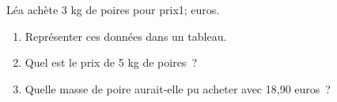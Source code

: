\documentclass[exercice]{thedocument}%
\begin{document}
%
Léa achète 3 kg de poires pour \<prix1; euros.
\begin{enumerate}
    \item Représenter ces données dans un tableau.
    \item Quel est le prix de 5 kg de poires~?
    \item Quelle masse de poire aurait-elle pu acheter avec 18,90 euros~?
\end{enumerate}
\end{document}
